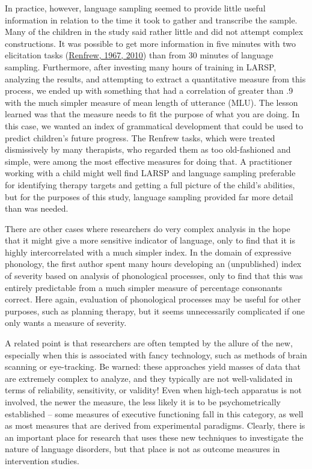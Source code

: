 \documentclass{krantz}
\begin{document}
In practice, however, language sampling seemed to provide little useful information in relation to the time it took to gather and transcribe the sample. Many of the children in the study said rather little and did not attempt complex constructions. It was possible to get more information in five minutes with two elicitation tasks (\protect\hyperlink{ref-renfrew1967}{Renfrew, 1967, 2010}) than from 30 minutes of language sampling. Furthermore, after investing many hours of training in LARSP, analyzing the results, and attempting to extract a quantitative measure from this process, we ended up with something that had a correlation of greater than .9 with the much simpler measure of mean length of utterance (MLU). The lesson learned was that the measure needs to fit the purpose of what you are doing. In this case, we wanted an index of grammatical development that could be used to predict children's future progress. The Renfrew tasks, which were treated dismissively by many therapists, who regarded them as too old-fashioned and simple, were among the most effective measures for doing that. A practitioner working with a child might well find LARSP and language sampling preferable for identifying therapy targets and getting a full picture of the child's abilities, but for the purposes of this study, language sampling provided far more detail than was needed.

There are other cases where researchers do very complex analysis in the hope that it might give a more sensitive indicator of language, only to find that it is highly intercorrelated with a much simpler index. In the domain of expressive phonology, the first author spent many hours developing an (unpublished) index of severity based on analysis of phonological processes, only to find that this was entirely predictable from a much simpler measure of percentage consonants correct. Here again, evaluation of phonological processes may be useful for other purposes, such as planning therapy, but it seems unnecessarily complicated if one only wants a measure of severity.

A related point is that researchers are often tempted by the allure of the new, especially when this is associated with fancy technology, such as methods of brain scanning or eye-tracking. Be warned: these approaches yield masses of data that are extremely complex to analyze, and they typically are not well-validated in terms of reliability, sensitivity, or validity! Even when high-tech apparatus is not involved, the newer the measure, the less likely it is to be psychometrically established -- some measures of executive functioning fall in this category, as well as most measures that are derived from experimental paradigms. Clearly, there is an important place for research that uses these new techniques to investigate the nature of language disorders, but that place is not as outcome measures in intervention studies.
\end{document}
